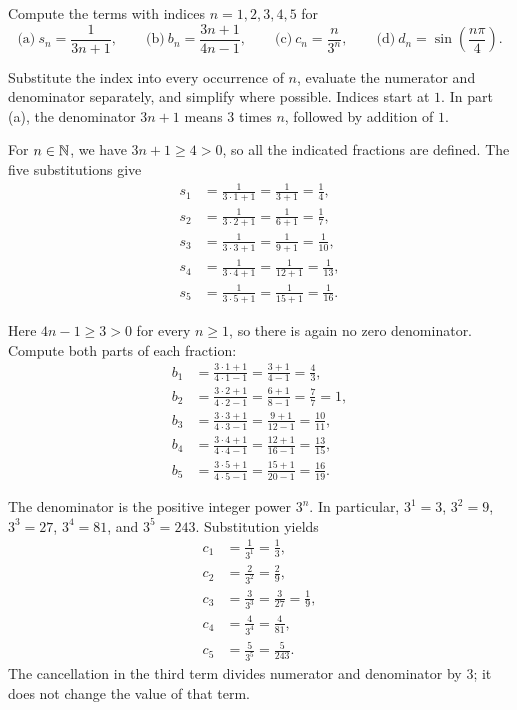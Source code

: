 \goal Compute the terms with indices $n=1,2,3,4,5$ for
\[
 \text{(a)}\ s_n=\frac1{3n+1},\qquad
 \text{(b)}\ b_n=\frac{3n+1}{4n-1},\qquad
 \text{(c)}\ c_n=\frac n{3^n},\qquad
 \text{(d)}\ d_n=\sin\left(\frac{n\pi}{4}\right).
\]

\idea Substitute the index into every occurrence of $n$, evaluate
the numerator and denominator separately, and simplify where possible.
Indices start at $1$. In part \textup{(a)}, the denominator $3n+1$
means $3$ times $n$, followed by addition of $1$.

For $n\in\mathbb{N}$, we have $3n+1\ge4>0$, so all the indicated fractions
are defined. The five substitutions give
\begin{align*}
 s_1&=\frac1{3\cdot1+1}=\frac1{3+1}=\frac14,\\
 s_2&=\frac1{3\cdot2+1}=\frac1{6+1}=\frac17,\\
 s_3&=\frac1{3\cdot3+1}=\frac1{9+1}=\frac1{10},\\
 s_4&=\frac1{3\cdot4+1}=\frac1{12+1}=\frac1{13},\\
 s_5&=\frac1{3\cdot5+1}=\frac1{15+1}=\frac1{16}.
\end{align*}

Here $4n-1\ge3>0$ for every $n\ge1$, so there is again no zero
denominator. Compute both parts of each fraction:
\begin{align*}
 b_1&=\frac{3\cdot1+1}{4\cdot1-1}
      =\frac{3+1}{4-1}=\frac43,\\
 b_2&=\frac{3\cdot2+1}{4\cdot2-1}
      =\frac{6+1}{8-1}=\frac77=1,\\
 b_3&=\frac{3\cdot3+1}{4\cdot3-1}
      =\frac{9+1}{12-1}=\frac{10}{11},\\
 b_4&=\frac{3\cdot4+1}{4\cdot4-1}
      =\frac{12+1}{16-1}=\frac{13}{15},\\
 b_5&=\frac{3\cdot5+1}{4\cdot5-1}
      =\frac{15+1}{20-1}=\frac{16}{19}.
\end{align*}

The denominator is the positive integer power $3^n$. In particular,
$3^1=3$, $3^2=9$, $3^3=27$, $3^4=81$, and $3^5=243$.
Substitution yields
\begin{align*}
 c_1&=\frac1{3^1}=\frac13,\\
 c_2&=\frac2{3^2}=\frac29,\\
 c_3&=\frac3{3^3}=\frac3{27}=\frac19,\\
 c_4&=\frac4{3^4}=\frac4{81},\\
 c_5&=\frac5{3^5}=\frac5{243}.
\end{align*}
The cancellation in the third term divides numerator and denominator
by $3$; it does not change the value of that term.

